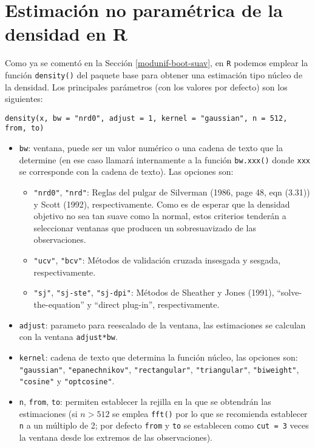 \documentclass[
]{book}
\theoremstyle{break}
\theoremstyle{definition}
\theoremstyle{definition}
\theoremstyle{definition}
\theoremstyle{remark}
\begin{document}
\hypertarget{npden-r}{%
\section{Estimación no paramétrica de la densidad en R}\label{npden-r}}

Como ya se comentó en la Sección \ref{modunif-boot-suav},
en \texttt{R} podemos emplear la función \texttt{density()} del paquete base para obtener
una estimación tipo núcleo de la densidad.
Los principales parámetros (con los valores por defecto) son los siguientes:

\begin{verbatim}
density(x, bw = "nrd0", adjust = 1, kernel = "gaussian", n = 512, from, to)
\end{verbatim}

\begin{itemize}
\item
  \texttt{bw}: ventana, puede ser un valor numérico o una cadena de texto que la determine
  (en ese caso llamará internamente a la función \texttt{bw.xxx()} donde \texttt{xxx} se corresponde
  con la cadena de texto). Las opciones son:

  \begin{itemize}
  \item
    \texttt{"nrd0"}, \texttt{"nrd"}: Reglas del pulgar de Silverman (1986, page 48, eqn (3.31)) y
    Scott (1992), respectivamente. Como es de esperar que la densidad objetivo
    no sea tan suave como la normal, estos criterios tenderán a seleccionar
    ventanas que producen un sobresuavizado de las observaciones.
  \item
    \texttt{"ucv"}, \texttt{"bcv"}: Métodos de validación cruzada insesgada y sesgada, respectivamente.
  \item
    \texttt{"sj"}, \texttt{"sj-ste"}, \texttt{"sj-dpi"}: Métodos de Sheather y Jones (1991),
    ``solve-the-equation'' y ``direct plug-in'', respectivamente.
  \end{itemize}
\item
  \texttt{adjust}: parameto para reescalado de la ventana, las estimaciones se calculan
  con la ventana \texttt{adjust*bw}.
\item
  \texttt{kernel}: cadena de texto que determina la función núcleo, las opciones son: \texttt{"gaussian"},
  \texttt{"epanechnikov"}, \texttt{"rectangular"}, \texttt{"triangular"}, \texttt{"biweight"}, \texttt{"cosine"} y \texttt{"optcosine"}.
\item
  \texttt{n}, \texttt{from}, \texttt{to}: permiten establecer la rejilla en la que se obtendrán las estimaciones
  (si \(n>512\) se emplea \texttt{fft()} por lo que se recomienda establecer \texttt{n} a un múltiplo de 2;
  por defecto \texttt{from} y \texttt{to} se establecen como \texttt{cut\ =\ 3} veces la ventana desde los extremos
  de las observaciones).
\end{itemize}
\end{document}
